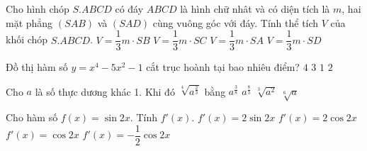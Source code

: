 \begin{ex}%
	Cho hình chóp $S.ABCD$ có đáy $ABCD$ là hình chữ nhât và có diện tích là $m$, hai mặt phẳng $(SAB)$ và $(SAD)$ cùng vuông góc với đáy. Tính thể tích $V$ của khối chóp $S.ABCD$.
	\choice
	{$V=\dfrac{1}{3}m\cdot SB$}
	{$V=\dfrac{1}{3}m\cdot SC$}
	{\True $V=\dfrac{1}{3}m\cdot SA$}
	{$V=\dfrac{1}{3}m\cdot SD$}
\end{ex}

\begin{ex}%
	Đồ thị hàm số $y=x^4 -5x^2 -1$ cắt trục hoành tại bao nhiêu điểm?
	\choice
	{$4$}
	{$3$}
	{$1$}
	{\True $2$}
\end{ex}

\begin{ex}%
	Cho $a$ là số thực dương khác 1. Khi đó $\sqrt[4]{a^{\frac{2}{3}}}$ bằng
	\choice
	{$a^{\frac{3}{8}}$}
	{$a^{\frac{8}{3}}$}
	{$\sqrt[3]{a^2}$}
	{\True $\sqrt[6]{a}$}
	
	
	
\end{ex} 



\begin{ex}%
	Cho hàm số $f(x)=\sin 2x$. Tính $f'(x)$.
	\choice
	{$f'(x)=2\sin 2x$}
	{\True $f'(x)=2\cos2x$}
	{$f'(x)=\cos2x$}
	{$f'(x)=-\dfrac{1}{2}\cos2x$}
	
	
\end{ex} 

